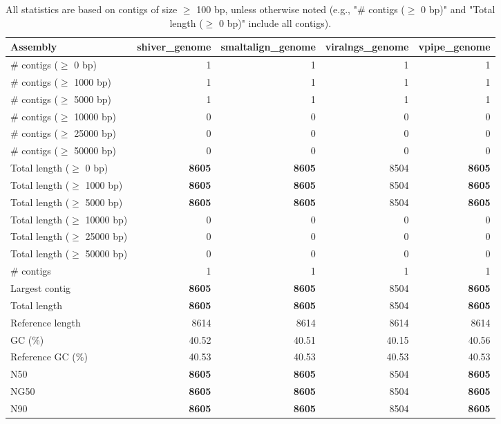 \documentclass[12pt,a4paper]{article}
\begin{document}
\begin{table}[ht]
\begin{center}
\caption{All statistics are based on contigs of size $\geq$ 100 bp, unless otherwise noted (e.g., "\# contigs ($\geq$ 0 bp)" and "Total length ($\geq$ 0 bp)" include all contigs).}
\begin{tabular}{|l*{4}{|r}|}
\hline
Assembly & shiver\_genome & smaltalign\_genome & viralngs\_genome & vpipe\_genome \\ \hline
\# contigs ($\geq$ 0 bp) & 1 & 1 & 1 & 1 \\ \hline
\# contigs ($\geq$ 1000 bp) & 1 & 1 & 1 & 1 \\ \hline
\# contigs ($\geq$ 5000 bp) & 1 & 1 & 1 & 1 \\ \hline
\# contigs ($\geq$ 10000 bp) & 0 & 0 & 0 & 0 \\ \hline
\# contigs ($\geq$ 25000 bp) & 0 & 0 & 0 & 0 \\ \hline
\# contigs ($\geq$ 50000 bp) & 0 & 0 & 0 & 0 \\ \hline
Total length ($\geq$ 0 bp) & {\bf 8605} & {\bf 8605} & 8504 & {\bf 8605} \\ \hline
Total length ($\geq$ 1000 bp) & {\bf 8605} & {\bf 8605} & 8504 & {\bf 8605} \\ \hline
Total length ($\geq$ 5000 bp) & {\bf 8605} & {\bf 8605} & 8504 & {\bf 8605} \\ \hline
Total length ($\geq$ 10000 bp) & 0 & 0 & 0 & 0 \\ \hline
Total length ($\geq$ 25000 bp) & 0 & 0 & 0 & 0 \\ \hline
Total length ($\geq$ 50000 bp) & 0 & 0 & 0 & 0 \\ \hline
\# contigs & 1 & 1 & 1 & 1 \\ \hline
Largest contig & {\bf 8605} & {\bf 8605} & 8504 & {\bf 8605} \\ \hline
Total length & {\bf 8605} & {\bf 8605} & 8504 & {\bf 8605} \\ \hline
Reference length & 8614 & 8614 & 8614 & 8614 \\ \hline
GC (\%) & 40.52 & 40.51 & 40.15 & 40.56 \\ \hline
Reference GC (\%) & 40.53 & 40.53 & 40.53 & 40.53 \\ \hline
N50 & {\bf 8605} & {\bf 8605} & 8504 & {\bf 8605} \\ \hline
NG50 & {\bf 8605} & {\bf 8605} & 8504 & {\bf 8605} \\ \hline
N90 & {\bf 8605} & {\bf 8605} & 8504 & {\bf 8605} \\ \hline

\end{tabular}
\end{center}
\end{table}
\end{document}
